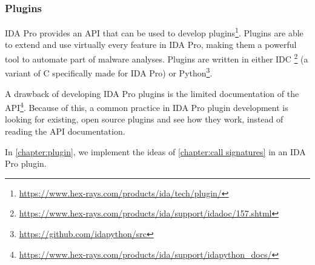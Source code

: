 \subsubsection{Plugins}\label{section:ida pro plugins}
IDA Pro provides an API that can be used to develop plugins\footnote{\tiny \url{https://www.hex-rays.com/products/ida/tech/plugin/}}. Plugins are able to extend and use virtually every feature in IDA Pro, making them a powerful tool to automate part of malware analyses. Plugins are written in either IDC \footnote{\tiny \url{https://www.hex-rays.com/products/ida/support/idadoc/157.shtml}} (a variant of C specifically made for IDA Pro) or Python\footnote{\tiny \url{https://github.com/idapython/src}}.

 A drawback of developing IDA Pro plugins is the limited documentation of the API\footnote{\tiny \url{https://www.hex-rays.com/products/ida/support/idapython_docs/}}. Because of this, a common practice in IDA Pro plugin development is looking for existing, open source plugins and see how they work, instead of reading the API documentation.

In \autoref{chapter:plugin}, we implement the ideas of \autoref{chapter:call signatures} in an IDA Pro plugin.
